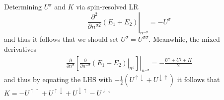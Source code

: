 \documentclass[xcolor=table,aspectratio=169]{beamer}
\numberwithin{equation}{section}
\begin{document}
\begin{frame}{Determining $U^\sigma$ and $K$ via spin-resolved LR}
    \begin{equation}
        \left.\frac{\partial ^2}{\partial n^{\sigma 2}} \left(E_1 + E_2\right) \right|_{n^{-\sigma}} = -U^\sigma
    \end{equation}
    and thus it follows that we should set $U^\sigma = U^{\sigma\sigma}$. Meanwhile, the mixed derivatives
    \begin{align}
        \left.\frac{\partial }{\partial n^{\sigma}}\left[\left.\frac{\partial }{\partial n^{-\sigma}} \left(E_1 + E_2\right) \right|_{n^{\sigma}}\right]\right|_{n^{-\sigma}}
        = -\frac{U^\uparrow + U^\downarrow + K}{2}
    \end{align}
    and thus by equating the LHS with $-\frac{1}{2}(U^{\uparrow\downarrow} + U^{\downarrow \uparrow})$ it follows that $K = - U^{\uparrow\uparrow} + U^{\uparrow\downarrow} + U^{\downarrow\uparrow} - U^{\downarrow\downarrow}$
\end{frame}
\end{document}
